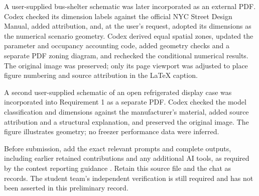 \documentclass[12pt]{article}
\begin{document}
A user-supplied bus-shelter schematic was later incorporated as an external PDF.
Codex checked its dimension labels against the official NYC Street Design Manual,
added attribution, and, at the user's request, adopted its dimensions as the
numerical scenario geometry. Codex derived equal spatial zones, updated the
parameter and occupancy accounting code, added geometry checks and a separate
PDF zoning diagram, and rechecked the conditional numerical results. The original image was preserved; only its page viewport was adjusted
to place figure numbering and source attribution in the LaTeX caption.

A second user-supplied schematic of an open refrigerated display case was
incorporated into Requirement 1 as a separate PDF. Codex checked the model
classification and dimensions against the manufacturer's material, added source
attribution and a structural explanation, and preserved the original image.
The figure illustrates geometry; no freezer performance data were inferred.

Before submission, add the exact relevant prompts and complete outputs,
including earlier retained contributions and any additional AI tools, as
required by the contest reporting guidance \cite{aipolicy}. Retain this source
file and the chat as records. The student team's independent verification is
still required and has not been asserted in this preliminary record.
\end{document}
